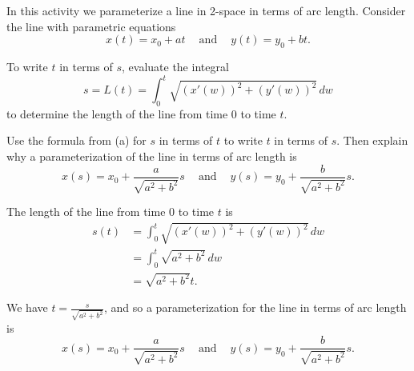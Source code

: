 \begin{activity} \label{A:9.8.4} In this activity we parameterize a
  line in 2-space in terms of arc length. Consider the line with
  parametric equations
\[x(t) = x_0+at \ \ \ \ \text{ and } \ \ \ \ y(t) = y_0+bt.\]
    \ba
    \item To write $t$ in terms of $s$, evaluate the integral
    \[s=L(t) = \int_{0}^t \sqrt{(x'(w))^2 + (y'(w))^2} \, dw\]
    to determine the length of the line from time 0 to time $t$.

  \item Use the formula from (a) for $s$ in terms of $t$ to write $t$
    in terms of $s$. Then explain why a parameterization of the line
    in terms of arc length is
 \begin{equation} \label{eq:9.8.line_arc_length_parameterization}
x(s) = x_0+\frac{a}{\sqrt{a^2+b^2}}s \ \ \ \ \text{ and } \ \ \ \ y(s) = y_0+\frac{b}{\sqrt{a^2+b^2}}s.
\end{equation}

    \ea

\end{activity}
\begin{smallhint}

\end{smallhint}
\begin{bighint}

\end{bighint}
\begin{activitySolution}
\ba
\item The length of the line from time 0 to time $t$ is 
\begin{align*}
s(t) &= \int_{0}^t \sqrt{(x'(w))^2 + (y'(w))^2} \, dw \\
    &= \int_0^t \sqrt{a^2+b^2} \, dw \\
    &= \sqrt{a^2+b^2}t.
\end{align*}
\item We have $t = \frac{s}{\sqrt{a^2+b^2}}$, and so a parameterization for the line in terms of arc length is
\[x(s) = x_0+\frac{a}{\sqrt{a^2+b^2}}s \ \ \ \ \text{ and } \ \ \ \ y(s) = y_0+\frac{b}{\sqrt{a^2+b^2}}s.\]
\ea
\end{activitySolution}
\aftera
